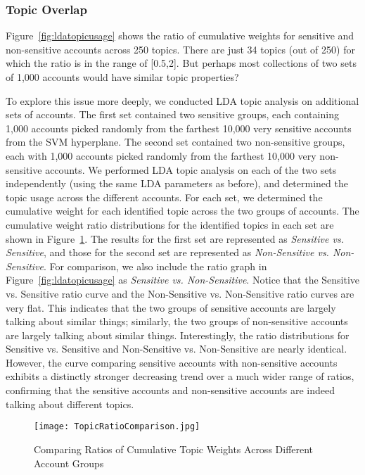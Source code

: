 \documentclass[conference]{IEEEtran}
\begin{document}
\subsubsection{Topic Overlap}
Figure~\ref{fig:ldatopicusage} shows the ratio of cumulative weights for sensitive and non-sensitive accounts across 250 topics. There are just 34 topics (out of 250) for which the ratio is in the range of [0.5,2]. But perhaps most collections of two sets of 1,000 accounts would have similar topic properties?

To explore this issue more deeply, we conducted LDA topic analysis on additional sets of accounts. The first set contained two sensitive groups, each containing 1,000 accounts picked randomly from the farthest 10,000 very sensitive accounts from the SVM hyperplane. The second set contained two non-sensitive groups, each with 1,000 accounts picked randomly from the farthest 10,000 very non-sensitive accounts. We performed LDA topic analysis on each of the two sets independently (using the same LDA parameters as before), and determined the topic usage across the different accounts. For each set, we determined the cumulative weight for each identified topic across the two groups of accounts.  The cumulative weight ratio distributions for the identified topics in each set are shown in Figure~\ref{fig:ratiocomparison}. The results for the first set are represented as \textit{Sensitive vs. Sensitive}, and those for the second set are represented as \textit{Non-Sensitive vs. Non-Sensitive}. For comparison, we also include the ratio graph in Figure~\ref{fig:ldatopicusage} as \textit{Sensitive vs. Non-Sensitive}. Notice that the Sensitive vs. Sensitive ratio curve and the Non-Sensitive vs. Non-Sensitive ratio curves are very flat. This indicates that the two groups of sensitive accounts are largely talking about similar things; similarly, the two groups of non-sensitive accounts are largely talking about similar things. Interestingly, the ratio distributions for Sensitive vs. Sensitive and Non-Sensitive vs. Non-Sensitive are nearly identical. However, the curve comparing sensitive accounts with non-sensitive accounts exhibits a distinctly stronger decreasing trend over a much wider range of ratios, confirming that the sensitive accounts and non-sensitive accounts are indeed talking about different topics. 



\begin{figure}[thb]
\begin{center}
  \centering
  \caption{Comparing Ratios of Cumulative Topic Weights Across Different Account Groups}
  \label{fig:ratiocomparison}
     \texttt{[image: TopicRatioComparison.jpg]}
\end{center}
\end{figure}
\end{document}
